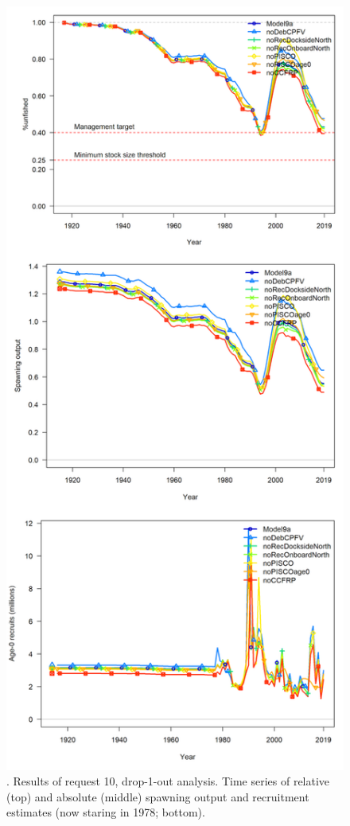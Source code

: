 \documentclass[12pt,]{article}
\begin{document}
\FloatBarrier

\begin{figure}
\centering
\includegraphics{Figures/STAR_request10.png}
\caption{. Results of request 10, drop-1-out analysis. Time series of
relative (top) and absolute (middle) spawning output and recruitment
estimates (now staring in 1978; bottom). \label{fig:STAR_request10}}
\end{figure}
\end{document}
